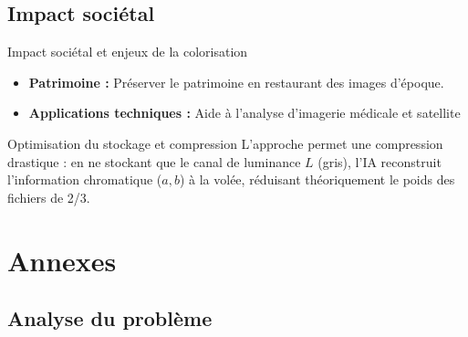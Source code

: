 \documentclass{beamer}
\begin{document}
\subsection{Impact sociétal}
\begin{frame}{Impact sociétal et enjeux de la colorisation}
    \small %
    \begin{itemize}
        \item \textbf{Patrimoine :} Préserver le patrimoine en restaurant des images d'époque.
        
        \item \textbf{Applications techniques :} Aide à l'analyse d'imagerie médicale et satellite
    \end{itemize}

    \vspace{0.2cm} %

    \begin{block}{Optimisation du stockage et compression}
        \footnotesize %
        L'approche permet une compression drastique : en ne stockant que le canal de luminance $L$ (gris), l'IA reconstruit l'information chromatique ($a, b$) à la volée, réduisant théoriquement le poids des fichiers de 2/3.
    \end{block}
\end{frame}

\section{Annexes}


\subsection{Analyse du problème}

\end{document}
